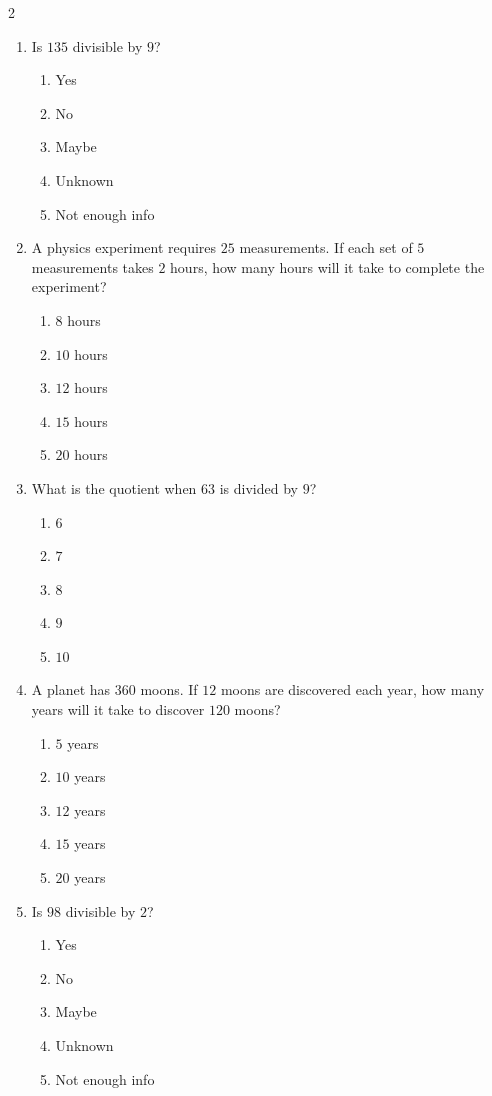 \documentclass[10pt]{article}
\begin{document}
\begin{multicols}{2}
\begin{enumerate}[label=\textbf{Q\arabic*.}, leftmargin=*, itemsep=6pt, parsep=0pt]
  \item \small Is $135$ divisible by $9$?
  \begin{enumerate}[label=(\Alph*), leftmargin=0.6cm, nosep, itemsep=2pt]
    \item Yes
    \item No
    \item Maybe
    \item Unknown
    \item Not enough info
  \end{enumerate}

  \item \small A physics experiment requires $25$ measurements. If each set of $5$ measurements takes $2$ hours, how many hours will it take to complete the experiment?
  \begin{enumerate}[label=(\Alph*), leftmargin=0.6cm, nosep, itemsep=2pt]
    \item $8$ hours
    \item $10$ hours
    \item $12$ hours
    \item $15$ hours
    \item $20$ hours
  \end{enumerate}

  \item \small What is the quotient when $63$ is divided by $9$?
  \begin{enumerate}[label=(\Alph*), leftmargin=0.6cm, nosep, itemsep=2pt]
    \item $6$
    \item $7$
    \item $8$
    \item $9$
    \item $10$
  \end{enumerate}

  \item \small A planet has $360$ moons. If $12$ moons are discovered each year, how many years will it take to discover $120$ moons?
  \begin{enumerate}[label=(\Alph*), leftmargin=0.6cm, nosep, itemsep=2pt]
    \item $5$ years
    \item $10$ years
    \item $12$ years
    \item $15$ years
    \item $20$ years
  \end{enumerate}

  \item \small Is $98$ divisible by $2$?
  \begin{enumerate}[label=(\Alph*), leftmargin=0.6cm, nosep, itemsep=2pt]
    \item Yes
    \item No
    \item Maybe
    \item Unknown
    \item Not enough info
  \end{enumerate}


\end{enumerate}
\end{multicols}
\end{document}
